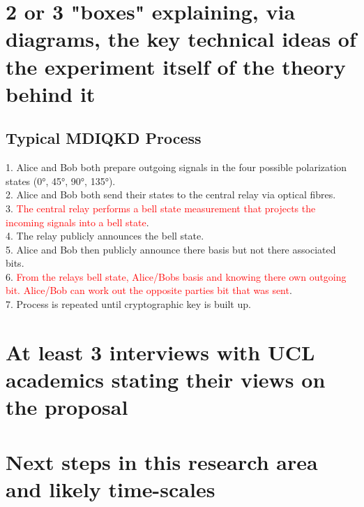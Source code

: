 \documentclass[journal]{vgtc}
\begin{document}
\section{2 or 3 "boxes" explaining, via diagrams, the key technical ideas of the experiment itself of the theory behind it}

\begin{tcolorbox}
\subsection*{Typical MDIQKD Process}

1. Alice and Bob both prepare outgoing signals in the four possible polarization states (\ang{0}, \ang{45}, \ang{90}, \ang{135}).\\
2. Alice and Bob both send their states to the central relay via optical fibres.\\
3. \textcolor{red}{The central relay performs a bell state measurement that projects the incoming signals into a bell state}.\\
4. The relay publicly announces the bell state.\\
5. Alice and Bob then publicly announce there basis but not there associated bits.\\
6. \textcolor{red}{From the relays bell state, Alice/Bobs basis and knowing there own outgoing bit. Alice/Bob can work out the opposite parties bit that was sent}.\\
7. Process is repeated until cryptographic key is built up.

\end{tcolorbox}

\section{At least 3 interviews with UCL academics stating their views on the proposal}

\section{Next steps in this research area and likely time-scales}

  

\end{document}
